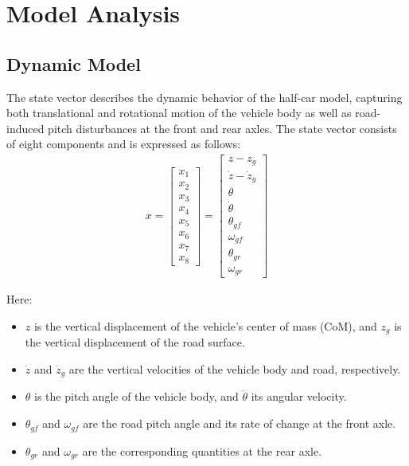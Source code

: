 \documentclass[]{report}
\begin{document}
\section{Model Analysis}
\subsection{Dynamic Model}

The state vector describes the dynamic behavior of the half-car model, capturing both translational and rotational motion of the vehicle body as well as road-induced pitch disturbances at the front and rear axles. The state vector consists of eight components and is expressed as follows:
\begin{align}
	x = \begin{bmatrix}
		x_1 \\ x_2 \\ x_3 \\ x_4 \\ x_5 \\ x_6 \\ x_7 \\ x_8
	\end{bmatrix} =
	\begin{bmatrix}
		z - z_g \\
		\dot{z} - \dot{z}_g \\
		\theta \\
		\dot{\theta} \\
		\theta_{gf} \\
		\omega_{gf} \\
		\theta_{gr} \\
		\omega_{gr}
	\end{bmatrix}
\end{align}

Here:
\begin{itemize}
	\item $z$ is the vertical displacement of the vehicle’s center of mass (CoM), and $z_g$ is the vertical displacement of the road surface.
	\item $\dot{z}$ and $\dot{z}_g$ are the vertical velocities of the vehicle body and road, respectively.
	\item $\theta$ is the pitch angle of the vehicle body, and $\dot{\theta}$ its angular velocity.
	\item $\theta_{gf}$ and $\omega_{gf}$ are the road pitch angle and its rate of change at the front axle.
	\item $\theta_{gr}$ and $\omega_{gr}$ are the corresponding quantities at the rear axle.
\end{itemize}
\end{document}
